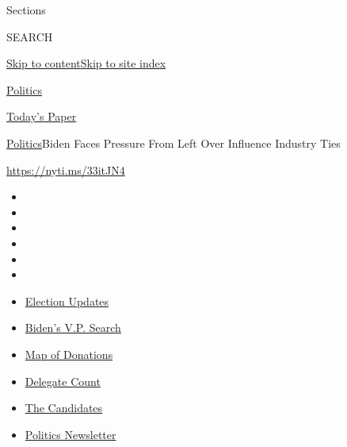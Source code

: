 Sections

SEARCH

\protect\hyperlink{site-content}{Skip to
content}\protect\hyperlink{site-index}{Skip to site index}

\href{https://www.nytimes.com/section/politics}{Politics}

\href{https://myaccount.nytimes.com/auth/login?response_type=cookie\&client_id=vi}{}

\href{https://www.nytimes.com/section/todayspaper}{Today's Paper}

\href{/section/politics}{Politics}\textbar{}Biden Faces Pressure From
Left Over Influence Industry Ties

\url{https://nyti.ms/33itJN4}

\begin{itemize}
\item
\item
\item
\item
\item
\item
\end{itemize}

\begin{itemize}
\item
  \href{https://www.nytimes.com/2020/07/31/us/elections/biden-vs-trump.html?action=click\&pgtype=Article\&state=default\&region=TOP_BANNER\&context=storylines_menu}{Election
  Updates}
\item
  \href{https://www.nytimes.com/article/biden-vice-president-2020.html?action=click\&pgtype=Article\&state=default\&region=TOP_BANNER\&context=storylines_menu}{Biden's
  V.P. Search}
\item
  \href{https://www.nytimes.com/interactive/2020/07/24/us/politics/trump-biden-campaign-donors.html?action=click\&pgtype=Article\&state=default\&region=TOP_BANNER\&context=storylines_menu}{Map
  of Donations}
\item
  \href{https://www.nytimes.com/interactive/2020/us/elections/delegate-count-primary-results.html?action=click\&pgtype=Article\&state=default\&region=TOP_BANNER\&context=storylines_menu}{Delegate
  Count}
\item
  \href{https://www.nytimes.com/interactive/2019/us/politics/2020-presidential-candidates.html?action=click\&pgtype=Article\&state=default\&region=TOP_BANNER\&context=storylines_menu}{The
  Candidates}
\item
  \href{https://www.nytimes.com/newsletters/politics?action=click\&pgtype=Article\&state=default\&region=TOP_BANNER\&context=storylines_menu}{Politics
  Newsletter}
\end{itemize}

